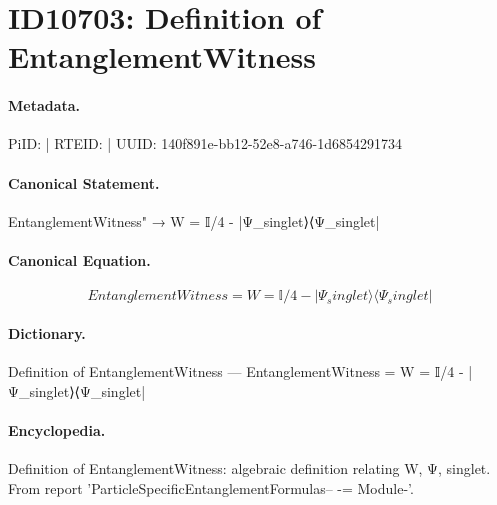 \section*{ID10703: Definition of EntanglementWitness}
\paragraph{Metadata.}
PiID:  | RTEID:  | UUID: 140f891e-bb12-52e8-a746-1d6854291734

\paragraph{Canonical Statement.}
EntanglementWitness" → W = 𝕀/4 - |Ψ\_singlet⟩⟨Ψ\_singlet|

\paragraph{Canonical Equation.}
\[
EntanglementWitness = W = 𝕀/4 - |Ψ_singlet⟩⟨Ψ_singlet|
\]

\paragraph{Dictionary.}
Definition of EntanglementWitness — EntanglementWitness = W = 𝕀/4 - |Ψ\_singlet⟩⟨Ψ\_singlet|

\paragraph{Encyclopedia.}
Definition of EntanglementWitness: algebraic definition relating W, Ψ, singlet. From report 'ParticleSpecificEntanglementFormulas-- -= Module-'.
